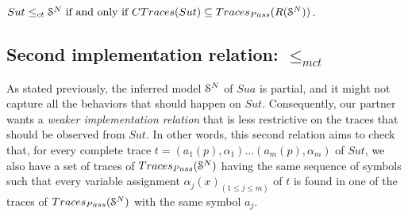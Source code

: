 \begin{proposition}
\label{rel:impl12}
${Sut} \leq_{ct} \EuScript{S}^{N} \text{ if and only if } CTraces({Sut})
\subseteq  Traces_{Pass}(R(\EuScript{S}^{N}))$.
\end{proposition}

\subsection{Second implementation relation: $\leq_{mct}$}

As stated previously, the inferred model $\EuScript{S}^{N}$ of
$\mathit{Sua}$ is partial, and it might not capture all the
behaviors that should happen on $\mathit{Sut}$. Consequently,
our partner wants a \emph{weaker implementation relation} that is
less restrictive on the traces that should be observed from
$\mathit{Sut}$.  In other words, this second relation aims to
check that, for every complete trace $t=(a_1(p), \alpha_1) \dots
(a_m(p), \alpha_m)$ of $\mathit{Sut}$, we also have a set of traces of
$Traces_{Pass}(\EuScript{S}^{N})$ having the same sequence of
symbols such that every variable assignment $\alpha_j(x)_{(1 \leq
j \leq m)}$ of $t$ is found in one of the traces of
$Traces_{Pass}(\EuScript{S}^{N})$ with the same symbol $a_j$.

